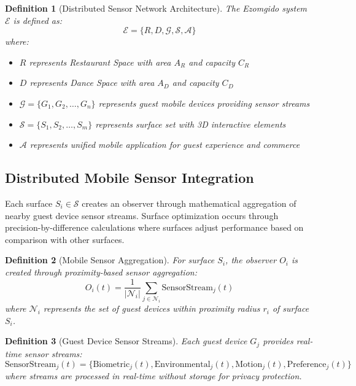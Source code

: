 \documentclass[12pt,a4paper]{article}
\newtheorem{definition}{Definition}
\begin{document}
\begin{definition}[Distributed Sensor Network Architecture]
The Ezomgido system $\mathcal{E}$ is defined as:
\begin{equation}
\mathcal{E} = \{R, D, \mathcal{G}, \mathcal{S}, \mathcal{A}\}
\end{equation}
where:
\begin{itemize}
\item $R$ represents Restaurant Space with area $A_R$ and capacity $C_R$
\item $D$ represents Dance Space with area $A_D$ and capacity $C_D$
\item $\mathcal{G} = \{G_1, G_2, \ldots, G_n\}$ represents guest mobile devices providing sensor streams
\item $\mathcal{S} = \{S_1, S_2, \ldots, S_m\}$ represents surface set with 3D interactive elements
\item $\mathcal{A}$ represents unified mobile application for guest experience and commerce
\end{itemize}
\end{definition}

\subsection{Distributed Mobile Sensor Integration}

Each surface $S_i \in \mathcal{S}$ creates an observer through mathematical aggregation of nearby guest device sensor streams. Surface optimization occurs through precision-by-difference calculations where surfaces adjust performance based on comparison with other surfaces.

\begin{definition}[Mobile Sensor Aggregation]
For surface $S_i$, the observer $O_i$ is created through proximity-based sensor aggregation:
\begin{equation}
O_i(t) = \frac{1}{|\mathcal{N}_i|} \sum_{j \in \mathcal{N}_i} \text{SensorStream}_j(t)
\end{equation}
where $\mathcal{N}_i$ represents the set of guest devices within proximity radius $r_i$ of surface $S_i$.
\end{definition}

\begin{definition}[Guest Device Sensor Streams]
Each guest device $G_j$ provides real-time sensor streams:
\begin{equation}
\text{SensorStream}_j(t) = \{\text{Biometric}_j(t), \text{Environmental}_j(t), \text{Motion}_j(t), \text{Preference}_j(t)\}
\end{equation}
where streams are processed in real-time without storage for privacy protection.
\end{definition}
\end{document}
